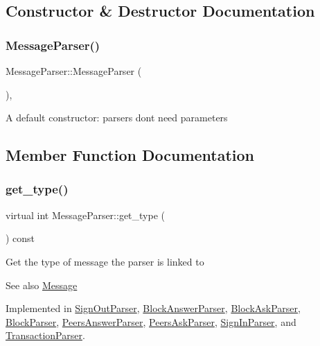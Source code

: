 \subsection{Constructor \& Destructor Documentation}
\mbox{\label{classMessageParser_a6548628a6db83ec8913e5f17454e14f0}} 
\subsubsection{\texorpdfstring{Message\+Parser()}{MessageParser()}}
{\footnotesize\ttfamily Message\+Parser\+::\+Message\+Parser (\begin{DoxyParamCaption}{ }\end{DoxyParamCaption})\hspace{0.3cm}{\ttfamily [explicit]}, {\ttfamily [default]}}

A default constructor\+: parsers don\textquotesingle{}t need parameters 

\subsection{Member Function Documentation}
\mbox{\label{classMessageParser_aa7c495d7b28a394e5752ca25ffff69d8}} 
\subsubsection{\texorpdfstring{get\+\_\+type()}{get\_type()}}
{\footnotesize\ttfamily virtual int Message\+Parser\+::get\+\_\+type (\begin{DoxyParamCaption}{ }\end{DoxyParamCaption}) const\hspace{0.3cm}{\ttfamily [pure virtual]}}

Get the type of message the parser is linked to \begin{DoxySeeAlso}{See also}
\mbox{\hyperlink{classMessage}{Message}} 
\end{DoxySeeAlso}


Implemented in \mbox{\hyperlink{classSignOutParser_afe949de785ce36746d69e19515a72d24}{Sign\+Out\+Parser}}, \mbox{\hyperlink{classBlockAnswerParser_af29553ca77e4879f40f60a871105b6d4}{Block\+Answer\+Parser}}, \mbox{\hyperlink{classBlockAskParser_add75da897c34702c33790947c9754500}{Block\+Ask\+Parser}}, \mbox{\hyperlink{classBlockParser_aa7334a81b976ec6244c0992cda44a824}{Block\+Parser}}, \mbox{\hyperlink{classPeersAnswerParser_a5f88ed07616ae3d17726f27b263645a6}{Peers\+Answer\+Parser}}, \mbox{\hyperlink{classPeersAskParser_abda1a00fdca208592d3f7e7b039f9ba7}{Peers\+Ask\+Parser}}, \mbox{\hyperlink{classSignInParser_a30af4fa4b99e704e48848aab284d6a24}{Sign\+In\+Parser}}, and \mbox{\hyperlink{classTransactionParser_a34bed6ceb924ae378b3b2e89a29ae230}{Transaction\+Parser}}.

